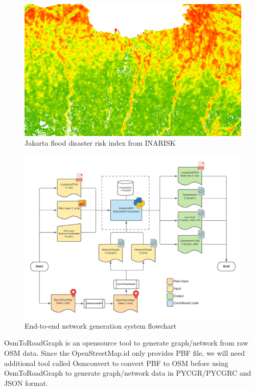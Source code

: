 \documentclass[conference]{IEEEtran}
\begin{document}
\begin{figure}
\centerline{\includegraphics[scale=0.35]{jakarta_flood_risk_layer_inarisk.png}}
\caption{Jakarta flood disaster risk index from INARISK}
\label{fig_jakarta_flood_risk_layer_inarisk}
\end{figure}

\begin{figure}
\centerline{\includegraphics[scale=0.6]{system-flowchart.png}}
\caption{End-to-end network generation system flowchart}
\label{fig_system_flowchart}
\end{figure}

OsmToRoadGraph\cite{Gemsa2017OsmToRoadGraph} is an opensource tool to generate graph/network from raw OSM data. Since the OpenStreetMap.id only provides PBF file, we will need additional tool called Osmconvert\cite{OpenStreetMap2019OsmConvert} to convert PBF to OSM before using OsmToRoadGraph to generate graph/network data in PYCGR/PYCGRC and JSON format.
\end{document}
